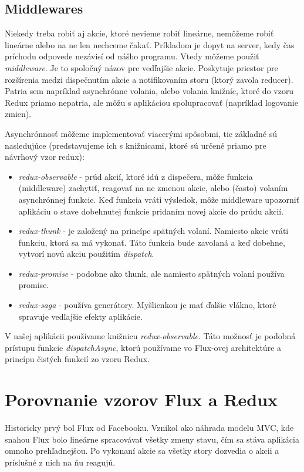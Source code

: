 \subsection{Middlewares}
\label{subsec:middlewares}
Niekedy treba robiť aj akcie, ktoré nevieme robiť lineárne, nemôžeme robiť lineárne alebo na ne len nechceme čakať. Príkladom je dopyt na server, kedy čas príchodu odpovede nezávisí od nášho programu. Vtedy môžeme použiť \emph{middleware}. Je to spoločný názov pre vedľajšie akcie. Poskytuje priestor pre rozšírenia medzi dispečnutím akcie a notifikovaním storu (ktorý zavola reducer). Patria sem napríklad asynchrónne volania, alebo volania knižníc, ktoré do vzoru Redux priamo nepatria, ale môžu s aplikáciou spolupracovať (napríklad logovanie zmien).

Asynchrónnosť môžeme implementovať viacerými spôsobmi, tie základné sú nasledujúce (predstavujeme ich s knižnicami, ktoré sú určené priamo pre návrhový vzor redux):
\begin{itemize}
  \item \emph{redux-observable} - prúd akcií, ktoré idú z dispečera, môže funkcia (middleware) zachytiť, reagovať na ne zmenou akcie, alebo (často) volaním asynchrónnej funkcie. Keď funkcia vráti výsledok, môže middleware upozorniť aplikáciu o stave dobehnutej funkcie pridaním novej akcie do prúdu akcií.
  \item \emph{redux-thunk} - je založený na princípe spätných volaní. Namiesto akcie vráti funkciu, ktorá sa má vykonať. Táto funkcia bude zavolaná a keď dobehne, vytvorí novú akciu použitím \emph{dispatch}.
  \item \emph{redux-promise} - podobne ako thunk, ale namiesto spätných volaní používa promise.
  \item \emph{redux-saga} - používa generátory. Myšlienkou je mať ďalšie vlákno, ktoré spravuje vedľajšie efekty aplikácie.
\end{itemize}

V našej aplikácii používame knižnicu \emph{redux-observable}. Táto možnosť je podobná prístupu funkcie \emph{dispatchAsync}, ktorú používame vo Flux-ovej architektúre a princípu čistých funkcií zo vzoru Redux. 







\section{Porovnanie vzorov Flux a Redux}
Historicky prvý bol Flux od Facebooku. Vznikol ako náhrada modelu MVC, kde snahou Flux bolo lineárne spracovávať všetky zmeny stavu, čím sa stáva aplikácia omnoho prehľadnejšou. Po vykonaní akcie sa všetky story dozvedia o akcii a príslušné z nich na ňu reagujú.

